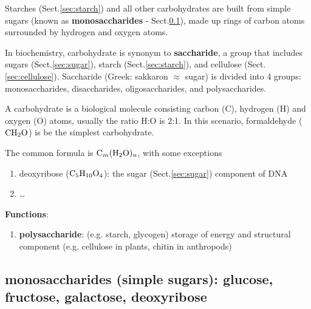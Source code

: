Starches (Sect.\ref{sec:starch}) and all other carbohydrates are built from
simple sugars (known as {\bf monosaccharides} - Sect.\ref{sec:monosaccharide}),
made up rings of carbon atoms surrounded by hydrogen and oxygen atoms.



In biochemistry, carbohydrate is synonym to {\bf saccharide}, a group that
includes sugars (Sect.\ref{sec:sugar}), starch (Sect.\ref{sec:starch}), and
cellulose (Sect.\ref{sec:cellulose}).
Saccharide (Greek: sakkaron $\approx$ sugar) is divided into 4 groups:
monosaccharides, disaccharides, oligosaccharides, and polysaccharides.


A carbohydrate is a biological molecule consisting carbon (C), hydrogen (H) and
oxygen (O) atoms, usually the ratio H:O is 2:1. In this scenario, formaldehyde
($\ce{CH2O}$) is be the simplest carbohydrate.

The common formula is $\ce{C_m(H_2O)_n}$, with some exceptions
\begin{enumerate}
  \item deoxyribose ($\ce{C5H10O4}$): the sugar (Sect.\ref{sec:sugar})
  component of DNA
  
  \item \ldots
\end{enumerate}


{\bf Functions}:
\begin{enumerate}
  \item {\bf polysaccharide}: (e.g. starch, glycogen) storage of energy
  and structural component (e.g. cellulose in plants, chitin in anthropods)
  
\end{enumerate}

\subsection{monosaccharides (simple sugars): glucose, fructose, galactose,
deoxyribose}
\label{sec:monosaccharide}

